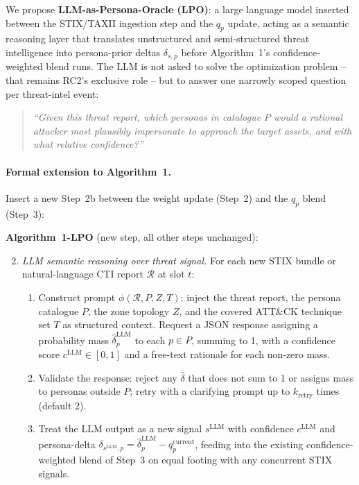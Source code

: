 \documentclass[10pt,twocolumn]{article}
\begin{document}
We propose \textbf{LLM-as-Persona-Oracle (LPO)}: a large language model inserted between the STIX/TAXII ingestion step and the $q_p$ update, acting as a semantic reasoning layer that translates unstructured and semi-structured threat intelligence into persona-prior deltas $\delta_{s,p}$ before Algorithm~1's confidence-weighted blend runs. The LLM is not asked to solve the optimization problem -- that remains RC2's exclusive role -- but to answer one narrowly scoped question per threat-intel event:

\begin{quote}
\emph{``Given this threat report, which personas in catalogue $P$ would a rational attacker most plausibly impersonate to approach the target assets, and with what relative confidence?''}
\end{quote}

\paragraph{Formal extension to Algorithm~1.}
Insert a new Step~2b between the weight update (Step~2) and the $q_p$ blend (Step~3):

\medskip
\noindent\textbf{Algorithm~1-LPO} (new step, all other steps unchanged):
\begin{enumerate}
\setcounter{enumi}{1}
\item[\textbf{2b.}] \textit{LLM semantic reasoning over threat signal.}
For each new STIX bundle or natural-language CTI report $\mathcal{R}$ at slot $t$:
\begin{enumerate}
\item Construct prompt $\phi(\mathcal{R}, P, Z, T)$: inject the threat report, the persona catalogue $P$, the zone topology $Z$, and the covered ATT\&CK technique set $T$ as structured context. Request a JSON response assigning a probability mass $\hat{\delta}_{p}^{\mathrm{LLM}}$ to each $p\in P$, summing to 1, with a confidence score $c^{\mathrm{LLM}}\in[0,1]$ and a free-text rationale for each non-zero mass.
\item Validate the response: reject any $\hat{\delta}$ that does not sum to 1 or assigns mass to personas outside $P$; retry with a clarifying prompt up to $k_{\mathrm{retry}}$ times (default 2).
\item Treat the LLM output as a new signal $s^{\mathrm{LLM}}$ with confidence $c^{\mathrm{LLM}}$ and persona-delta $\delta_{s^{\mathrm{LLM}},p} = \hat{\delta}_{p}^{\mathrm{LLM}} - q_p^{\mathrm{current}}$, feeding into the existing confidence-weighted blend of Step~3 on equal footing with any concurrent STIX signals.
\end{enumerate}
\end{enumerate}
\medskip
\end{document}

